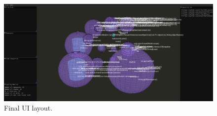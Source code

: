 \begin{figure}[h]
    \centering
    \includegraphics[width=\textwidth]{inc/images/COVI_Visualization.png}
    \caption{Final UI layout.}
    \label{fig:finalui}
\end{figure}